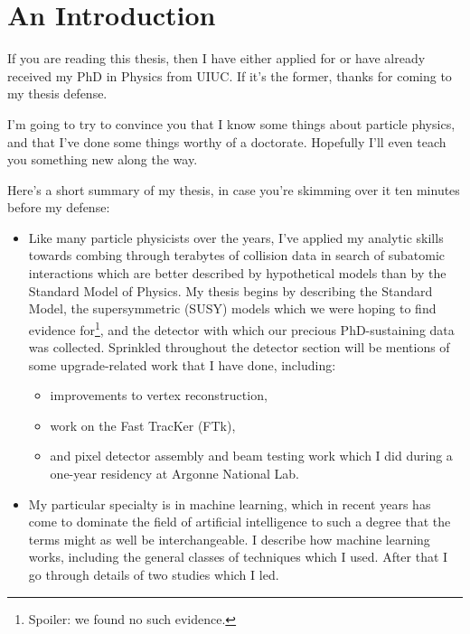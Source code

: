 \chapter*{An Introduction}

If you are reading this thesis, then I have either applied for or have  already received my PhD in Physics from UIUC. If it's the former, thanks for coming to my thesis defense.

I'm going to try to convince you that I know some things about particle physics, and that I've done some things worthy of a doctorate. Hopefully I'll even teach you something new along the way.

Here's a short summary of my thesis, in case you're skimming over it ten minutes before my defense:

\begin{itemize}

    \item Like many particle physicists over the years, I've applied my analytic skills towards combing through terabytes of collision data in search of subatomic interactions which are better described by hypothetical models than by the Standard Model of Physics. My thesis begins by describing the Standard Model, the supersymmetric (SUSY) models which we were hoping to find evidence for\footnote{Spoiler: we found no such evidence.}, and the detector with which our precious PhD-sustaining data was collected. Sprinkled throughout the detector section will be mentions of some upgrade-related work that I have done, including:
    
    \begin{itemize}
        \item improvements to vertex reconstruction,
        \item work on the Fast TracKer (FTk),
        \item and pixel detector assembly and beam testing work which I did during a one-year residency at Argonne National Lab.
    \end{itemize}

    \item My particular specialty is in machine learning, which in recent years has come to dominate the field of artificial intelligence to such a degree that the terms might as well be interchangeable. I describe how machine learning works, including the general classes of techniques which I used. After that I go through details of two studies which I led.
    
    \begin{itemize}
    

\end{itemize}
\end{itemize}
